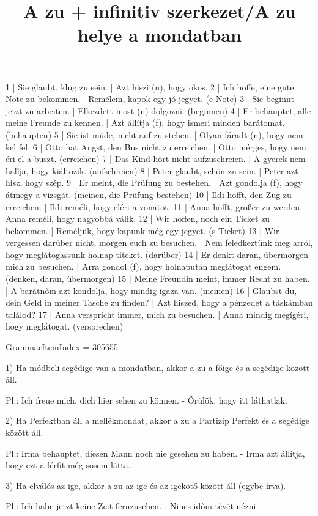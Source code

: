 \begin{exmp}
1 | Sie glaubt, klug zu sein. | Azt hiszi (n), hogy okos.
2 | Ich hoffe, eine gute Note zu bekommen. | Remélem, kapok egy jó jegyet. (e Note)
3 | Sie beginnt jetzt zu arbeiten. | Elkezdett most (n) dolgozni. (beginnen)
4 | Er behauptet, alle meine Freunde zu kennen. | Azt állítja (f), hogy ismeri minden barátomat. (behaupten)
5 | Sie ist müde, nicht auf zu stehen. | Olyan fáradt (n), hogy nem kel fel.
6 | Otto hat Angst, den Bus nicht zu erreichen. | Otto mérges, hogy nem éri el a buszt. (erreichen)
7 | Das Kind hört nicht aufzuschreien. | A gyerek nem hallja, hogy kiáltozik. (aufschreien)
8 | Peter glaubt, schön zu sein. | Peter azt hisz, hogy szép.
9 | Er meint, die Prüfung zu bestehen. | Azt gondolja (f), hogy átmegy a vizsgát. (meinen, die Prüfung bestehen)
10 | Ildi hofft, den Zug zu erreichen. | Ildi reméli, hogy eléri a vonatot.
11 | Anna hofft, größer zu werden. | Anna reméli, hogy nagyobbá válik.
12 | Wir hoffen, noch ein Ticket zu bekommen. | Reméljük, hogy kapunk még egy jegyet. (s Ticket)
13 | Wir vergessen darüber nicht, morgen euch zu besuchen. | Nem feledkeztünk meg arról, hogy meglátogassunk holnap titeket. (darüber)
14 | Er denkt daran, übermorgen mich zu besuchen. | Arra gondol (f), hogy holnapután meglátogat engem. (denken, daran, übermorgen)
15 | Meine Freundin meint, immer Recht zu haben. | A barátnőm azt kondolja, hogy mindig igaza van. (meinen)
16 | Glaubst du, dein Geld in meiner Tasche zu finden? | Azt hiszed, hogy a pénzedet a táskámban találod?
17 | Anna verspricht immer, mich zu besuchen. | Anna mindig megígéri, hogy meglátogat. (versprechen)
\end{exmp}

\title{A zu + infinitiv szerkezet/A zu helye a mondatban}

GrammarItemIndex = 305655

\begin{desc}
1) Ha módbeli segédige van a mondatban, akkor a zu a főige és a segédige között áll.

Pl.: Ich freue mich, dich hier sehen zu können. - Örülök, hogy itt láthatlak.

2) Ha Perfektban áll a mellékmondat, akkor a zu a Partizip Perfekt és a segédige között áll.

Pl.: Irma behauptet, diesen Mann noch nie gesehen zu haben. - Irma azt állítja, hogy ezt a férfit még sosem látta.

3) Ha elválós az ige, akkor a zu az ige és az igekötő között áll (egybe írva).

Pl.: Ich habe jetzt keine Zeit fernzusehen. - Nincs időm tévét nézni.
\end{desc}

